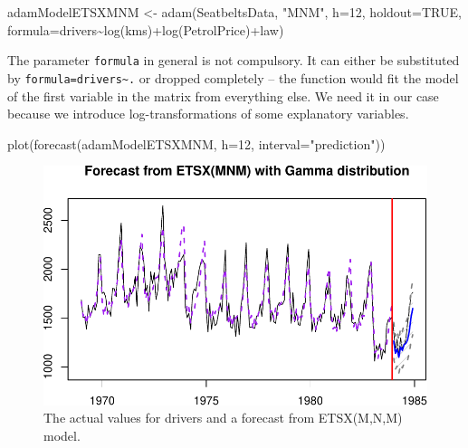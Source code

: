 \documentclass[
]{book}
\newenvironment{Shaded}{\begin{snugshade}}{\end{snugshade}}
\newcommand{\AttributeTok}[1]{\textcolor[rgb]{0.77,0.63,0.00}{#1}}
\newcommand{\ConstantTok}[1]{\textcolor[rgb]{0.00,0.00,0.00}{#1}}
\newcommand{\DecValTok}[1]{\textcolor[rgb]{0.00,0.00,0.81}{#1}}
\newcommand{\FunctionTok}[1]{\textcolor[rgb]{0.00,0.00,0.00}{#1}}
\newcommand{\NormalTok}[1]{#1}
\newcommand{\OtherTok}[1]{\textcolor[rgb]{0.56,0.35,0.01}{#1}}
\newcommand{\SpecialCharTok}[1]{\textcolor[rgb]{0.00,0.00,0.00}{#1}}
\newcommand{\StringTok}[1]{\textcolor[rgb]{0.31,0.60,0.02}{#1}}
\theoremstyle{definition}
\theoremstyle{definition}
\theoremstyle{definition}
\theoremstyle{definition}
\theoremstyle{remark}
\begin{document}
\begin{Shaded}
\begin{Highlighting}[]
\NormalTok{adamModelETSXMNM }\OtherTok{\textless{}{-}} \FunctionTok{adam}\NormalTok{(SeatbeltsData, }\StringTok{"MNM"}\NormalTok{, }\AttributeTok{h=}\DecValTok{12}\NormalTok{, }\AttributeTok{holdout=}\ConstantTok{TRUE}\NormalTok{,}
                         \AttributeTok{formula=}\NormalTok{drivers}\SpecialCharTok{\textasciitilde{}}\FunctionTok{log}\NormalTok{(kms)}\SpecialCharTok{+}\FunctionTok{log}\NormalTok{(PetrolPrice)}\SpecialCharTok{+}\NormalTok{law)}
\end{Highlighting}
\end{Shaded}

The parameter \texttt{formula} in general is not compulsory. It can either be substituted by \texttt{formula=drivers\textasciitilde{}.} or dropped completely -- the function would fit the model of the first variable in the matrix from everything else. We need it in our case because we introduce log-transformations of some explanatory variables.

\begin{Shaded}
\begin{Highlighting}[]
\FunctionTok{plot}\NormalTok{(}\FunctionTok{forecast}\NormalTok{(adamModelETSXMNM, }\AttributeTok{h=}\DecValTok{12}\NormalTok{, }\AttributeTok{interval=}\StringTok{"prediction"}\NormalTok{))}
\end{Highlighting}
\end{Shaded}

\begin{figure}
\centering
\includegraphics{Svetunkov--2022----ADAM_files/figure-latex/SeatbeltsForecastX-1.pdf}
\caption{\label{fig:SeatbeltsForecastX}The actual values for drivers and a forecast from ETSX(M,N,M) model.}
\end{figure}
\end{document}
